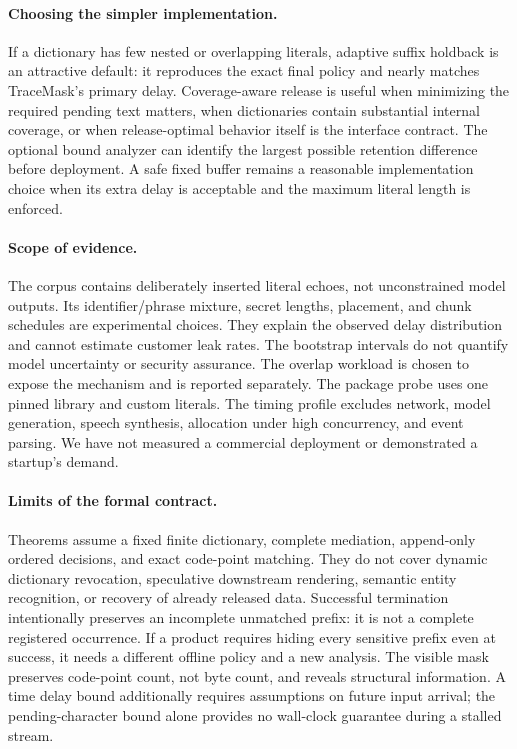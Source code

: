 \documentclass[11pt,a4paper]{article}
\begin{document}
\paragraph{Choosing the simpler implementation.}
If a dictionary has few nested or overlapping literals, adaptive suffix holdback is an attractive default: it reproduces the exact final policy and nearly matches TraceMask's primary delay. Coverage-aware release is useful when minimizing the required pending text matters, when dictionaries contain substantial internal coverage, or when release-optimal behavior itself is the interface contract. The optional bound analyzer can identify the largest possible retention difference before deployment. A safe fixed buffer remains a reasonable implementation choice when its extra delay is acceptable and the maximum literal length is enforced.

\paragraph{Scope of evidence.}
The corpus contains deliberately inserted literal echoes, not unconstrained model outputs. Its identifier/phrase mixture, secret lengths, placement, and chunk schedules are experimental choices. They explain the observed delay distribution and cannot estimate customer leak rates. The bootstrap intervals do not quantify model uncertainty or security assurance. The overlap workload is chosen to expose the mechanism and is reported separately. The package probe uses one pinned library and custom literals. The timing profile excludes network, model generation, speech synthesis, allocation under high concurrency, and event parsing. We have not measured a commercial deployment or demonstrated a startup's demand.

\paragraph{Limits of the formal contract.}
Theorems assume a fixed finite dictionary, complete mediation, append-only ordered decisions, and exact code-point matching. They do not cover dynamic dictionary revocation, speculative downstream rendering, semantic entity recognition, or recovery of already released data. Successful termination intentionally preserves an incomplete unmatched prefix: it is not a complete registered occurrence. If a product requires hiding every sensitive prefix even at success, it needs a different offline policy and a new analysis. The visible mask preserves code-point count, not byte count, and reveals structural information. A time delay bound additionally requires assumptions on future input arrival; the pending-character bound alone provides no wall-clock guarantee during a stalled stream.
\end{document}
